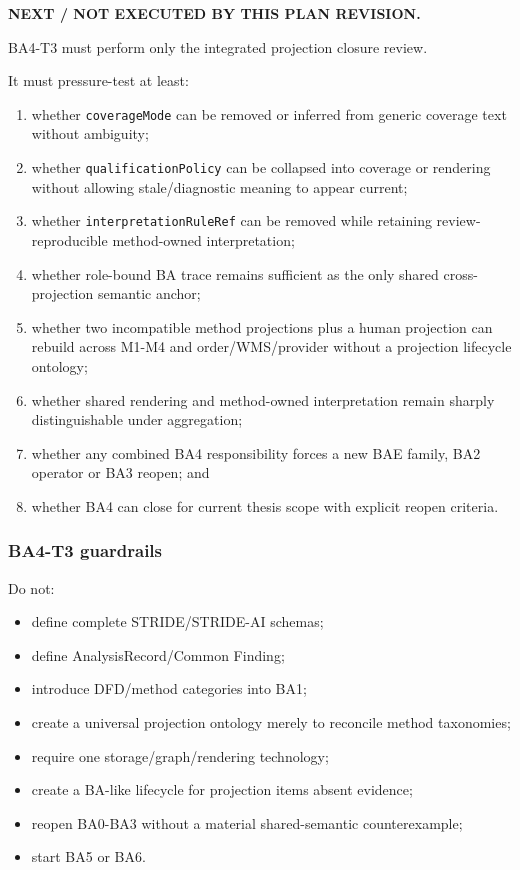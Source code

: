 \documentclass[11pt,a4paper]{article}
\providecommand{\tightlist}{\setlength{\itemsep}{0pt}\setlength{\parskip}{0pt}}
\begin{document}
\textbf{NEXT / NOT EXECUTED BY THIS PLAN REVISION.}

BA4-T3 must perform only the integrated projection closure review.

It must pressure-test at least:

\begin{enumerate}
\def\labelenumi{\arabic{enumi}.}
\tightlist
\item
  whether \texttt{coverageMode} can be removed or inferred from generic
  coverage text without ambiguity;
\item
  whether \texttt{qualificationPolicy} can be collapsed into coverage or
  rendering without allowing stale/diagnostic meaning to appear current;
\item
  whether \texttt{interpretationRuleRef} can be removed while retaining
  review-reproducible method-owned interpretation;
\item
  whether role-bound BA trace remains sufficient as the only shared
  cross-projection semantic anchor;
\item
  whether two incompatible method projections plus a human projection
  can rebuild across M1-M4 and order/WMS/provider without a projection
  lifecycle ontology;
\item
  whether shared rendering and method-owned interpretation remain
  sharply distinguishable under aggregation;
\item
  whether any combined BA4 responsibility forces a new BAE family, BA2
  operator or BA3 reopen; and
\item
  whether BA4 can close for current thesis scope with explicit reopen
  criteria.
\end{enumerate}

\subsubsection{BA4-T3 guardrails}\label{ba4-t3-guardrails}

Do not:

\begin{itemize}
\tightlist
\item
  define complete STRIDE/STRIDE-AI schemas;
\item
  define AnalysisRecord/Common Finding;
\item
  introduce DFD/method categories into BA1;
\item
  create a universal projection ontology merely to reconcile method
  taxonomies;
\item
  require one storage/graph/rendering technology;
\item
  create a BA-like lifecycle for projection items absent evidence;
\item
  reopen BA0-BA3 without a material shared-semantic counterexample;
\item
  start BA5 or BA6.
\end{itemize}
\end{document}
